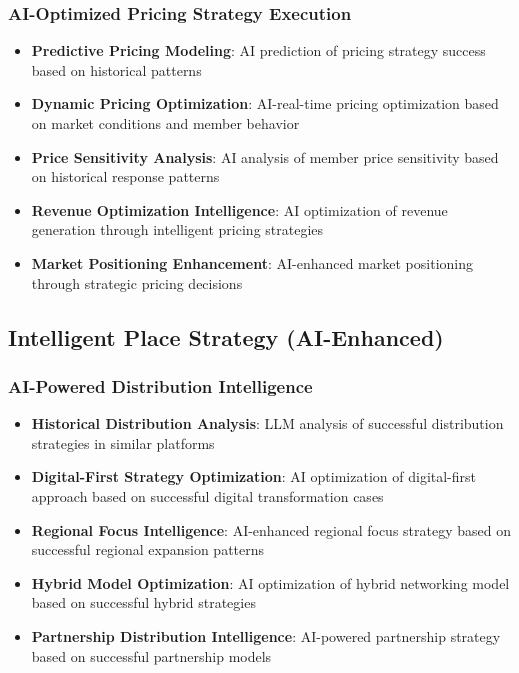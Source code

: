 \subsubsection{AI-Optimized Pricing Strategy Execution}

\begin{itemize}
    \item \textbf{Predictive Pricing Modeling}: AI prediction of pricing strategy success based on historical patterns
    \item \textbf{Dynamic Pricing Optimization}: AI-real-time pricing optimization based on market conditions and member behavior
    \item \textbf{Price Sensitivity Analysis}: AI analysis of member price sensitivity based on historical response patterns
    \item \textbf{Revenue Optimization Intelligence}: AI optimization of revenue generation through intelligent pricing strategies
    \item \textbf{Market Positioning Enhancement}: AI-enhanced market positioning through strategic pricing decisions
\end{itemize}

\subsection{Intelligent Place Strategy (AI-Enhanced)}

\subsubsection{AI-Powered Distribution Intelligence}

\begin{itemize}
    \item \textbf{Historical Distribution Analysis}: LLM analysis of successful distribution strategies in similar platforms
    \item \textbf{Digital-First Strategy Optimization}: AI optimization of digital-first approach based on successful digital transformation cases
    \item \textbf{Regional Focus Intelligence}: AI-enhanced regional focus strategy based on successful regional expansion patterns
    \item \textbf{Hybrid Model Optimization}: AI optimization of hybrid networking model based on successful hybrid strategies
    \item \textbf{Partnership Distribution Intelligence}: AI-powered partnership strategy based on successful partnership models
\end{itemize}

